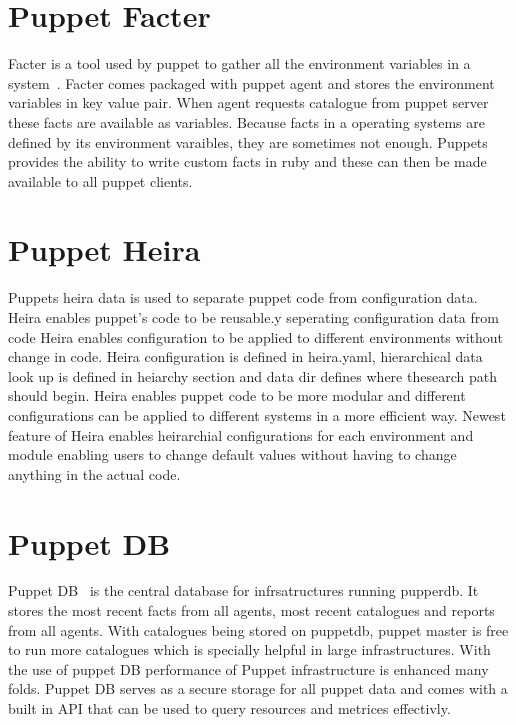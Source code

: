 \section{Puppet Facter}

Facter is a tool used by puppet to gather all the environment
variables in a system~\cite{hid-sp18-413-puppet-facter}. Facter comes packaged with puppet agent and
stores the environment variables in key value pair. When agent
requests catalogue from puppet server these facts are available as
variables. Because facts in a operating systems are defined by its
environment varaibles, they are sometimes not enough. Puppets
provides the ability to write custom facts in ruby and these can then
be made available to all puppet clients.

\section{Puppet Heira}

Puppets heira data is used to separate puppet code from configuration
data. Heira enables puppet's code to be reusable.y seperating
configuration data from code Heira enables configuration to be applied
to different environments without change in code. Heira configuration
is defined in heira.yaml,  hierarchical data look up is defined in
heiarchy section and  data dir defines where thesearch  path should
begin. Heira enables puppet code to be more modular and different
configurations can be applied to different systems in a more efficient
way. Newest feature of Heira enables heirarchial configurations for
each environment and module enabling users to change default values
without having to change anything in the actual code.

\section{Puppet DB}
Puppet DB~\cite{hid-sp18-413-puppetdb} is the central database for infrsatructures running pupperdb.  It
stores the most recent facts from all agents, most recent catalogues and reports
from all agents. With catalogues being stored on puppetdb, puppet master is free
to run more catalogues which is specially helpful in large infrastructures. With
the use of puppet DB performance of Puppet infrastructure is enhanced many
folds. Puppet DB serves as a secure storage for all puppet data and comes with a
built in API that can be used to query resources and metrices effectivly.


